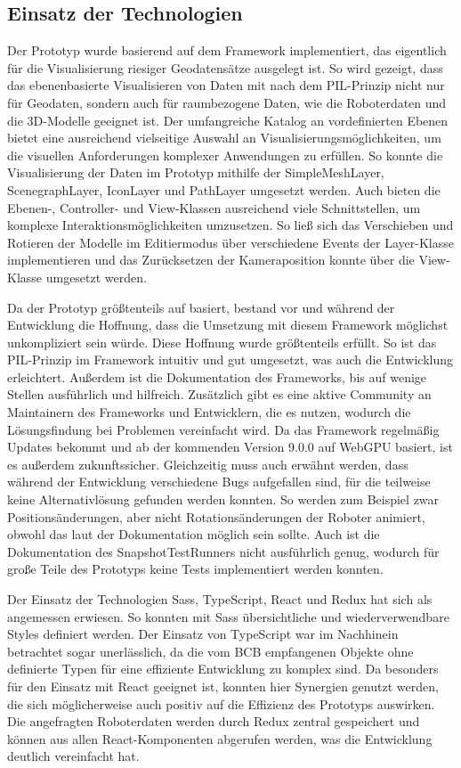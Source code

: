 \subsection{Einsatz der Technologien}
Der Prototyp wurde basierend auf dem Framework \deckgl{} implementiert, das eigentlich für die Visualisierung riesiger Geodatensätze ausgelegt ist. So wird gezeigt, dass das ebenenbasierte Visualisieren von Daten mit \deckgl{} nach dem \ac{PIL}-Prinzip nicht nur für Geodaten, sondern auch für raumbezogene Daten, wie die Roboterdaten und die 3D-Modelle geeignet ist. Der umfangreiche Katalog an vordefinierten Ebenen bietet eine ausreichend vielseitige Auswahl an Visualisierungsmöglichkeiten, um die visuellen Anforderungen komplexer Anwendungen zu erfüllen. So konnte die Visualisierung der Daten im Prototyp mithilfe der SimpleMeshLayer, ScenegraphLayer, IconLayer und PathLayer umgesetzt werden. Auch bieten die Ebenen-, Controller- und View-Klassen ausreichend viele Schnittstellen, um komplexe Interaktionsmöglichkeiten umzusetzen. So ließ sich das Verschieben und Rotieren der Modelle im Editiermodus über verschiedene Events der Layer-Klasse implementieren und das Zurücksetzen der Kameraposition konnte über die View-Klasse umgesetzt werden.

Da der Prototyp größtenteils auf \deckgl{} basiert, bestand vor und während der Entwicklung die Hoffnung, dass die Umsetzung mit diesem Framework möglichst unkompliziert sein würde. Diese Hoffnung wurde größtenteils erfüllt. So ist das \ac{PIL}-Prinzip im Framework intuitiv und gut umgesetzt, was auch die Entwicklung erleichtert. Außerdem ist die Dokumentation des Frameworks, bis auf wenige Stellen ausführlich und hilfreich. Zusätzlich gibt es eine aktive Community an Maintainern des Frameworks und Entwicklern, die es nutzen, wodurch die Lösungsfindung bei Problemen vereinfacht wird. Da das Framework regelmäßig Updates bekommt und ab der kommenden Version 9.0.0 auf WebGPU basiert, ist es außerdem zukunftssicher. Gleichzeitig muss auch erwähnt werden, dass während der Entwicklung verschiedene Bugs aufgefallen sind, für die teilweise keine Alternativlösung gefunden werden konnten. So werden zum Beispiel zwar Positionsänderungen, aber nicht Rotationsänderungen der Roboter animiert, obwohl das laut der Dokumentation möglich sein sollte. Auch ist die Dokumentation des SnapshotTestRunners nicht ausführlich genug, wodurch für große Teile des Prototyps keine Tests implementiert werden konnten.

Der Einsatz der Technologien \ac{Sass}, TypeScript, React und Redux hat sich als angemessen erwiesen. So konnten mit \ac{Sass} übersichtliche und wiederverwendbare Styles definiert werden. Der Einsatz von TypeScript war im Nachhinein betrachtet sogar unerlässlich, da die vom \ac{BCB} empfangenen Objekte ohne definierte Typen für eine effiziente Entwicklung zu komplex sind. Da \deckgl{} besonders für den Einsatz mit React geeignet ist, konnten hier Synergien genutzt werden, die sich möglicherweise auch positiv auf die Effizienz des Prototyps auswirken. Die angefragten Roboterdaten werden durch Redux zentral gespeichert und können aus allen React-Komponenten abgerufen werden, was die Entwicklung deutlich vereinfacht hat.

